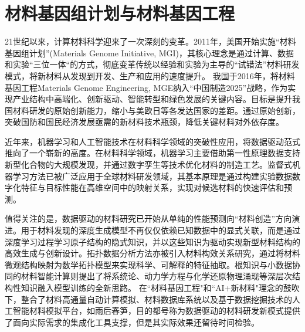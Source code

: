 
\section{材料基因组计划与材料基因工程}
21世纪以来，计算材料科学迎来了一次深刻的变革。2011年，美国开始实施``材料基因组计划''\textrm{(Materials Genome Initiative, MGI)}，其核心理念是通过计算、数据和实验``三位一体``的方式，彻底变革传统以经验和实验为主导的``试错法''材料研发模式，将新材料从发现到开发、生产和应用的速度提升。%
我国于2016年，将材料基因工程\textrm{Materials Genome Engineering, MGE}纳入``中国制造2025''战略，作为实现产业结构中高端化、创新驱动、智能转型和绿色发展的关键内容。目标是提升我国材料研发的原始创新能力，缩小与美欧日等各发达国家的差距。通过原始创新，突破国防和国民经济发展亟需的新材料技术瓶颈，降低关键材料对外依存度。


近年来，机器学习和人工智能技术在材料科学领域的突破性应用，将数据驱动范式推向了一个崭新的高度。在材料科学领域，机器学习主要借助第一性原理数据支持新型化合物的大规模发现，并通过数字孪生等技术优化材料的制造工艺。监督式机器学习方法已被广泛应用于全球材料研发领域，其基本原理是通过构建实验数据数字化特征与目标性能在高维空间中的映射关系，实现对候选材料的快速评估和预测。

值得关注的是，数据驱动的材料研究已开始从单纯的性能预测向``材料创造''方向演进。用于材料发现的深度生成模型不再仅仅依赖已知数据中的显式关联，而是通过深度学习过程学习原子结构的隐式知识，并以这些知识为驱动实现新型材料结构的高效生成与创新设计。拓扑数据分析方法亦被引入材料构效关系研究，通过将材料微观结构映射为数学拓扑模型来实现科学、可解释的特征抽取。根知识与小数据协同的材料智能计算则提出了将系统论、动力学方程与化学还原物理涌现等深层次结构性知识融入模型训练的全新思路。%
在``材料基因工程"和``\textrm{AI}+新材料"理念的鼓吹下，整合了材料高通量自动计算模拟、材料数据库系统以及基于数据挖掘技术的人工智能材料模拟平台，如雨后春笋，目的都号称为数据驱动的材料研发新模式提供了面向实际需求的集成化工具支撑，但是其实际效果还留待时间检验。

